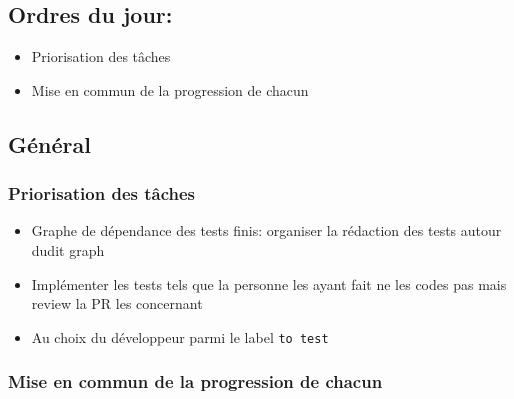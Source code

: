 \documentclass[a4paper, 12pt]{report}
\begin{document}
\subsection*{Ordres du jour:}

\begin{itemize}

\item
  Priorisation des tâches
\item
  Mise en commun de la progression de chacun
\end{itemize}

\subsection*{Général}

\subsubsection*{Priorisation des tâches}

\begin{itemize}

\item
  Graphe de dépendance des tests finis: organiser la rédaction des tests
  autour dudit graph
\item
  Implémenter les tests tels que la personne les ayant fait ne les codes
  pas mais review la PR les concernant
\item
  Au choix du développeur parmi le label \texttt{to\ test}
\end{itemize}

\subsubsection{Mise en commun de la progression de chacun}
\end{document}
